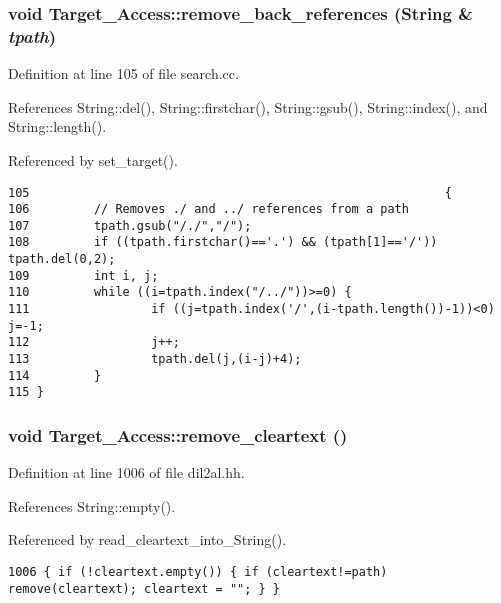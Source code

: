 \subsubsection{\setlength{\rightskip}{0pt plus 5cm}void Target\_\-Access::remove\_\-back\_\-references ({\bf String} \& {\em tpath})\hspace{0.3cm}{\tt  [protected]}}\label{classTarget__Access_b2}




Definition at line 105 of file search.cc.

References String::del(), String::firstchar(), String::gsub(), String::index(), and String::length().

Referenced by set\_\-target().



\footnotesize\begin{verbatim}105                                                          {
106         // Removes ./ and ../ references from a path
107         tpath.gsub("/./","/");
108         if ((tpath.firstchar()=='.') && (tpath[1]=='/')) tpath.del(0,2);
109         int i, j;
110         while ((i=tpath.index("/../"))>=0) {
111                 if ((j=tpath.index('/',(i-tpath.length())-1))<0) j=-1;
112                 j++;
113                 tpath.del(j,(i-j)+4);
114         }
115 }
\end{verbatim}\normalsize 
{}
\subsubsection{\setlength{\rightskip}{0pt plus 5cm}void Target\_\-Access::remove\_\-cleartext ()\hspace{0.3cm}{\tt  [inline]}}\label{classTarget__Access_a14}




Definition at line 1006 of file dil2al.hh.

References String::empty().

Referenced by read\_\-cleartext\_\-into\_\-String().



\footnotesize\begin{verbatim}1006 { if (!cleartext.empty()) { if (cleartext!=path) remove(cleartext); cleartext = ""; } }
\end{verbatim}\normalsize 
{}
